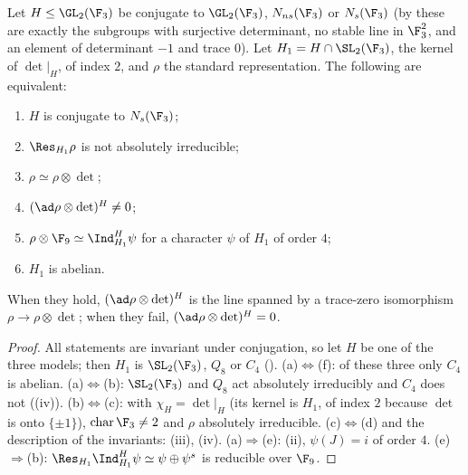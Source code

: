 \begin{theorem}\label{thm:reps:three-images}
Let $H\le\GL_2(\F_3)$ be conjugate to $\GL_2(\F_3)$, $N_{ns}(\F_3)$ or $N_s(\F_3)$ (by  these are exactly the subgroups with
surjective determinant, no stable line in $\F_3^2$, and an element of determinant $-1$ and trace $0$). Let $H_1=H\cap\SL_2(\F_3)$, the kernel of
$\det|_H$, of index $2$, and $\rho$ the standard representation. The following are equivalent:
\begin{enumerate}[label=(\alph*)]
\item $H$ is conjugate to $N_s(\F_3)$;
\item $\Res_{H_1}\rho$ is not absolutely irreducible;
\item $\rho\simeq\rho\otimes\det$;
\item $(\ad\rho\otimes\det)^H\ne0$;
\item $\rho\otimes\F_9\simeq\Ind_{H_1}^H\psi$ for a character $\psi$ of $H_1$ of order $4$;
\item $H_1$ is abelian.
\end{enumerate}
When they hold, $(\ad\rho\otimes\det)^H$ is the line spanned by a trace-zero isomorphism $\rho\to\rho\otimes\det$; when they fail, $(\ad\rho\otimes\det)^H=0$.
\end{theorem}

\begin{proof}
All statements are invariant under conjugation, so let $H$ be one of the three models; then $H_1$ is $\SL_2(\F_3)$, $Q_8$ or $C_4$ ().
(a)$\Leftrightarrow$(f): of these three only $C_4$ is abelian. (a)$\Leftrightarrow$(b): $\SL_2(\F_3)$ and $Q_8$ act absolutely irreducibly and $C_4$ does
not ((iv)). (b)$\Leftrightarrow$(c):  with $\chi_H=\det|_H$ (its kernel is $H_1$, of index $2$
because $\det$ is onto $\{\pm1\}$), $\operatorname{char}\F_3\ne2$ and $\rho$ absolutely irreducible. (c)$\Leftrightarrow$(d) and the description of the
invariants: (iii), (iv). (a)$\Rightarrow$(e): (ii), $\psi(J)=i$ of order $4$.
(e)$\Rightarrow$(b): $\Res_{H_1}\Ind_{H_1}^H\psi\simeq\psi\oplus\psi^s$ is reducible over $\F_9$.
\end{proof}

